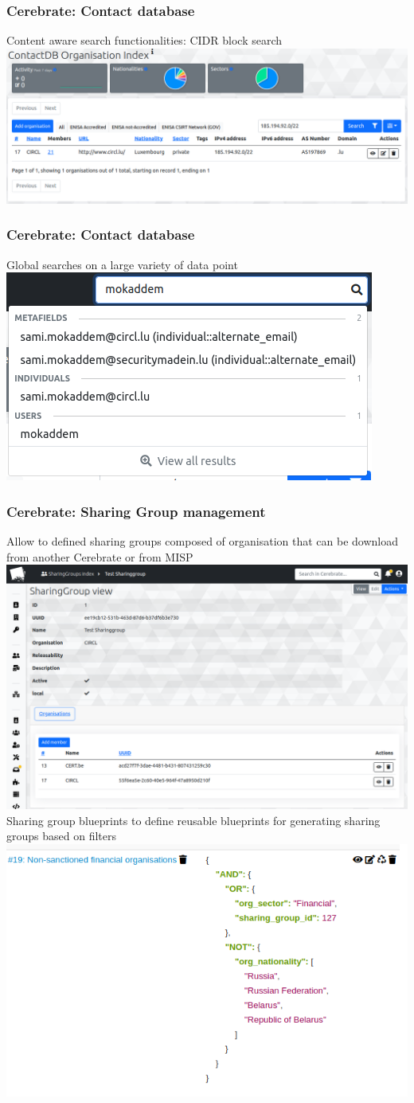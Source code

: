 \begin{frame}
    \frametitle{Cerebrate: Contact database}
    Content aware search functionalities: CIDR block search
    \includegraphics[width=0.99\linewidth]{pictures/cerebrate2.png}
\end{frame}

\begin{frame}
    \frametitle{Cerebrate: Contact database}
    Global searches on a large variety of data point
    \includegraphics[width=0.99\linewidth]{pictures/cerebrate3.png}
\end{frame}

\begin{frame}
    \frametitle{Cerebrate: Sharing Group management}
    Allow to defined sharing groups composed of organisation that can be download from another Cerebrate or from MISP
    \includegraphics[width=0.66\linewidth]{pictures/cerebrate-sg.png}
    Sharing group blueprints to define reusable blueprints for generating sharing groups based on filters
    \includegraphics[width=0.33\linewidth]{pictures/misp-sg-blueprint.png}
\end{frame}

